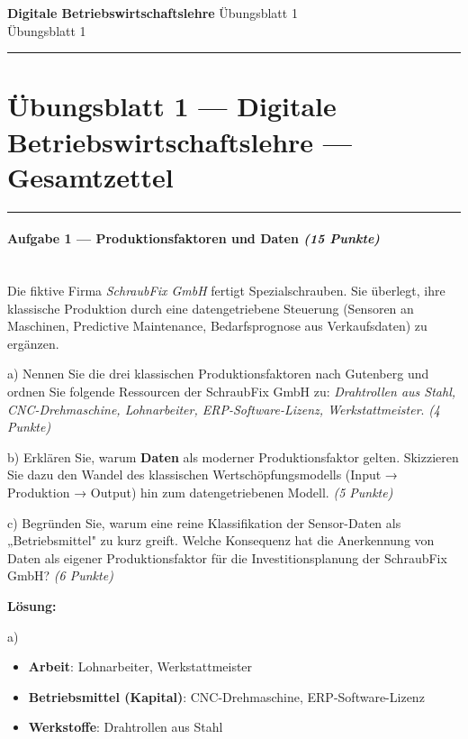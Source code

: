 \documentclass[11pt, a4paper]{article}
\providecommand{\nichttitle}{Übungsblatt}
\providecommand{\nichtsubtitle}{}
\renewcommand{\nichttitle}{Digitale Betriebswirtschaftslehre}
\renewcommand{\nichtsubtitle}{Übungsblatt 1}
\begin{document}
\begin{center}
{\Large\bfseries\color{accent}\nichttitle}
\ifx\nichtsubtitle\empty\else
  \\[2pt]{\normalsize\color{accent!80!black}\nichtsubtitle}
\fi
\\[2pt]
\color{accent}\rule{0.4\linewidth}{0.8pt}\color{black}
\end{center}
\vspace{4pt}


\section{Übungsblatt 1 — Digitale Betriebswirtschaftslehre — Gesamtzettel}


\noindent\textcolor{rulegray}{\rule{\linewidth}{0.4pt}}


\paragraph{Aufgabe 1 — Produktionsfaktoren und Daten \textit{(15 Punkte)}}\mbox{}\\[2pt]

Die fiktive Firma \textit{SchraubFix GmbH} fertigt Spezialschrauben. Sie überlegt, ihre klassische Produktion durch eine datengetriebene Steuerung (Sensoren an Maschinen, Predictive Maintenance, Bedarfsprognose aus Verkaufsdaten) zu ergänzen.


a) Nennen Sie die drei klassischen Produktionsfaktoren nach Gutenberg und ordnen Sie folgende Ressourcen der SchraubFix GmbH zu: \textit{Drahtrollen aus Stahl, CNC-Drehmaschine, Lohnarbeiter, ERP-Software-Lizenz, Werkstattmeister}. \textit{(4 Punkte)}


b) Erklären Sie, warum \textbf{Daten} als moderner Produktionsfaktor gelten. Skizzieren Sie dazu den Wandel des klassischen Wertschöpfungsmodells (Input → Produktion → Output) hin zum datengetriebenen Modell. \textit{(5 Punkte)}


c) Begründen Sie, warum eine reine Klassifikation der Sensor-Daten als „Betriebsmittel" zu kurz greift. Welche Konsequenz hat die Anerkennung von Daten als eigener Produktionsfaktor für die Investitionsplanung der SchraubFix GmbH? \textit{(6 Punkte)}


\textbf{Lösung:}


a)

\begin{itemize}
  \item \textbf{Arbeit}: Lohnarbeiter, Werkstattmeister
  \item \textbf{Betriebsmittel (Kapital)}: CNC-Drehmaschine, ERP-Software-Lizenz
  \item \textbf{Werkstoffe}: Drahtrollen aus Stahl
\end{itemize}
\end{document}
